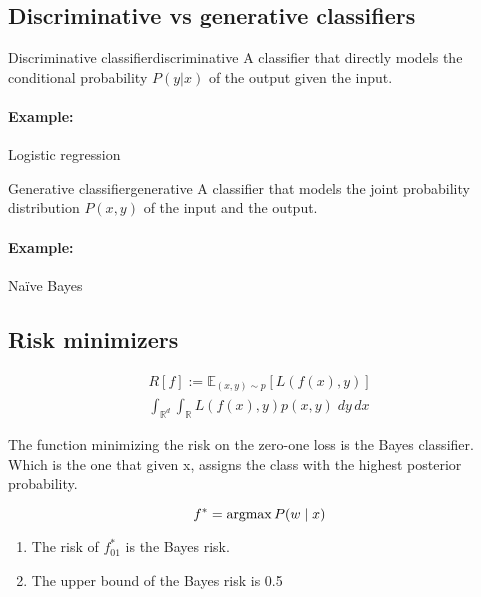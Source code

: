 \subsection{Discriminative vs generative classifiers}

\begin{definition}{Discriminative classifier}{discriminative}
	A classifier that directly models the conditional probability
	\(P(y | x)\) of the output given the input.

	\paragraph{Example:} Logistic regression
\end{definition}

\begin{definition}{Generative classifier}{generative}
	A classifier that models the joint probability distribution
	\(P(x, y)\) of the input and the output.

	\paragraph{Example:} Naïve Bayes
\end{definition}

\subsection{Risk minimizers}

\begin{align*}
	R[f] := \mathds{E}_{(x, y) \sim p} [ L(f(x), y) ] \\
	\int_{\mathds{R}^d} \int_{\mathds{R}} L(f(x), y) p(x, y)\; dy\, dx
\end{align*}

\begin{prop}{}{}

	The function minimizing the risk on the zero-one loss is the Bayes
	classifier. Which is the one that given x, assigns the class with the
	highest posterior probability.

	\[f^* = \operatorname{argmax} {P(w \mid x)}\]

	\begin{enumerate}
		\item The risk of \(f_{01}^*\) is the Bayes risk.
		\item The upper bound of the Bayes risk is 0.5
	\end{enumerate}

\end{prop}


